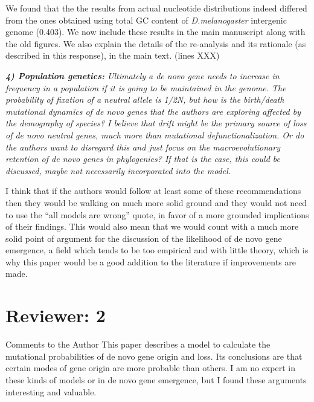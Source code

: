 \documentclass[12pt,a4paper]{article}
\begin{document}
We found that the the results from actual nucleotide distributions indeed differed from the ones obtained using total GC content of \textit{D.melanogaster} intergenic genome (0.403). We now include these results in the main manuscript along with the old figures. We also explain the details of the re-analysis and its rationale (as described in this response), in the main text. (lines XXX)



{\itshape \textbf{4) Population genetics:} Ultimately a de novo gene needs to increase in frequency in a population if it is going to be maintained in the genome. The probability of fixation of a neutral allele is 1/2N, but how is the birth/death mutational dynamics of de novo genes that the authors are exploring affected by the demography of species? I believe that drift might be the primary source of loss of de novo neutral genes, much more than mutational defunctionalization. Or do the authors want to disregard this and just focus on the macroevolutionary retention of de novo genes in phylogenies? If that is the case, this could be discussed, maybe not necessarily incorporated into the model.}



I think that if the authors would follow at least some of these recommendations then they would be walking on much more solid ground and they would not need to use the ``all models are wrong'' quote, in favor of a more grounded implications of their findings. This would also mean that we would count with a much more solid point of argument for the discussion of the likelihood of de novo gene emergence, a field which tends to be too empirical and with little theory, which is why this paper would be a good addition to the literature if improvements are made.

\section*{Reviewer: 2}

Comments to the Author
This paper describes a model to calculate the mutational probabilities of de novo gene origin and loss. Its conclusions are that certain modes of gene origin are more probable than others. I am no expert in these kinds of models or in de novo gene emergence, but I found these arguments interesting and valuable.
\end{document}

